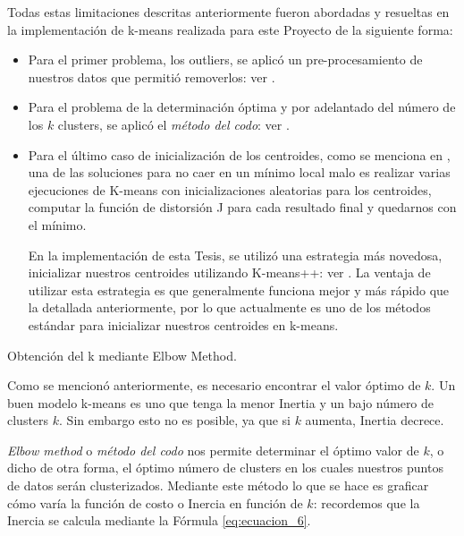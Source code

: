 \documentclass[12pt,a4paper]{article}
\makeatletter
\renewcommand\paragraph{\@startsection{paragraph}{4}{\z@}
            {-2.5ex\@plus -1ex \@minus -.25ex}
            {1.25ex \@plus .25ex}
            {\normalfont\normalsize\bfseries}}
\makeatother
\begin{document}
\begin{sloppypar}
\begin{enumerate}
\end{enumerate}

Todas estas limitaciones descritas anteriormente fueron abordadas y resueltas en la implementación de k-means realizada para este Proyecto de la siguiente forma:

\begin{itemize}

\item Para el primer problema, los outliers, se aplicó un pre-procesamiento de nuestros datos que permitió removerlos: ver \textit{}.

\item Para el problema de la determinación óptima y por adelantado del número de los $k$ clusters, se aplicó el \textit{método del codo}: ver \textit{}.

\item Para el último caso de inicialización de los centroides, como se menciona en \textit{}, una de las soluciones para no caer en un mínimo local malo es realizar varias ejecuciones de K-means con inicializaciones aleatorias para los centroides, computar la función de distorsión J para cada resultado final y quedarnos con el mínimo. 

En la implementación de esta Tesis, se utilizó una estrategia más novedosa, inicializar nuestros centroides utilizando K-means++: ver \textit{}. La ventaja de utilizar esta estrategia es que generalmente funciona mejor y más rápido que la detallada anteriormente, por lo que actualmente es uno de los métodos estándar para inicializar nuestros centroides en k-means. \cite{K_means_plus_plus}
\end{itemize}

\cleardoublepage
\paragraph{Obtención del k mediante Elbow Method.}\label{Elbow_Met}

Como se mencionó anteriormente, es necesario encontrar el valor óptimo de $k$. Un buen modelo k-means es uno que tenga la menor Inertia y un bajo número de clusters $k$. Sin embargo esto no es posible, ya que si $k$ aumenta, Inertia decrece.

\textit{Elbow method} o \textit{método del codo} nos permite determinar el óptimo valor de $k$, o dicho de otra forma, el óptimo número de clusters en los cuales nuestros puntos de datos serán clusterizados. Mediante este método lo que se hace es graficar cómo varía la función de costo o Inercia en función de $k$: recordemos que la Inercia se calcula mediante la Fórmula \ref{eq:ecuacion_6}. 


\end{sloppypar}
\end{document}
